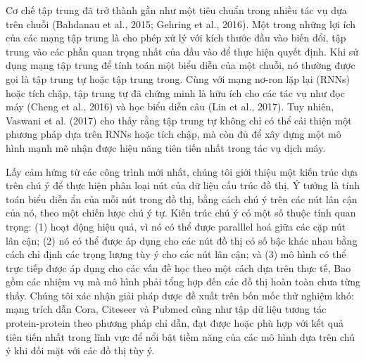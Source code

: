 Cơ chế tập trung đã trở thành gần như một tiêu chuẩn trong nhiều tác vụ dựa trên chuỗi (Bahdanau et al., 2015; Gehring et al., 2016). Một trong những lợi ích của các mạng tập trung là cho phép xử lý với kích thước đầu vào biến đổi, tập trung vào các phần quan trọng nhất của đầu vào để thực hiện quyết định. Khi sử dụng mạng tập trung để tính toán một biểu diễn của một chuỗi, nó thường được gọi là tập trung tự hoặc tập trung trong. Cùng với mạng nơ-ron lặp lại (RNNs) hoặc tích chập, tập trung tự đã chứng minh là hữu ích cho các tác vụ như đọc máy (Cheng et al., 2016) và học biểu diễn câu (Lin et al., 2017). Tuy nhiên, Vaswani et al. (2017) cho thấy rằng tập trung tự không chỉ có thể cải thiện một phương pháp dựa trên RNNs hoặc tích chập, mà còn đủ để xây dựng một mô hình mạnh mẽ nhận được hiệu năng tiên tiến nhất trong tác vụ dịch máy.

Lấy cảm hứng từ các công trình mới nhất, chúng tôi giới thiệu một kiến trúc dựa trên chú ý để thực hiện phân loại nút của dữ liệu cấu trúc đồ thị. Ý tưởng là tính toán biểu diễn ẩn của mỗi nút trong đồ thị, bằng cách chú ý trên các nút lân cận của nó, theo một chiến lược chú ý tự. Kiến trúc chú ý có một số thuộc tính quan trọng: (1) hoạt động hiệu quả, vì nó có thể được paralllel hoá giữa các cặp nút lân cận; (2) nó có thể được áp dụng cho các nút đồ thị có số bậc khác nhau bằng cách chỉ định các trọng lượng tùy ý cho các nút lân cận; và (3) mô hình có thể trực tiếp được áp dụng cho các vấn đề học theo một cách dựa trên thực tế, Bao gồm các nhiệm vụ mà mô hình phải tổng hợp đến các đồ thị hoàn toàn chưa từng thấy. Chúng tôi xác nhận giải pháp được đề xuất trên bốn mốc thử nghiệm khó: mạng trích dẫn Cora, Citeseer và Pubmed cũng như tập dữ liệu tương tác protein-protein theo phương pháp chỉ dẫn, đạt được hoặc phù hợp với kết quả tiên tiến nhất trong lĩnh vực để nổi bật tiềm năng của các mô hình dựa trên chú ý khi đối mặt với các đồ thị tùy ý.

